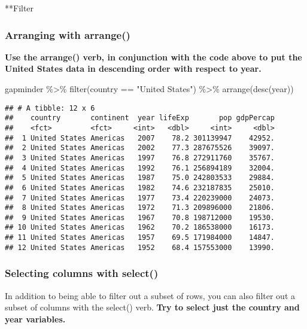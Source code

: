\documentclass[
]{article}
\newenvironment{Shaded}{\begin{snugshade}}{\end{snugshade}}
\newcommand{\FunctionTok}[1]{\textcolor[rgb]{0.00,0.00,0.00}{#1}}
\newcommand{\NormalTok}[1]{#1}
\newcommand{\SpecialCharTok}[1]{\textcolor[rgb]{0.00,0.00,0.00}{#1}}
\newcommand{\StringTok}[1]{\textcolor[rgb]{0.31,0.60,0.02}{#1}}
\begin{document}
**Filter

\hypertarget{arranging-with-arrange}{%
\subsubsection{Arranging with arrange()}\label{arranging-with-arrange}}

\textbf{Use the arrange() verb, in conjunction with the code above to
put the United States data in descending order with respect to year.}

\begin{Shaded}
\begin{Highlighting}[]
\NormalTok{gapminder }\SpecialCharTok{\%\textgreater{}\%} 
          \FunctionTok{filter}\NormalTok{(country }\SpecialCharTok{==} \StringTok{"United States"}\NormalTok{) }\SpecialCharTok{\%\textgreater{}\%} 
          \FunctionTok{arrange}\NormalTok{(}\FunctionTok{desc}\NormalTok{(year))}
\end{Highlighting}
\end{Shaded}

\begin{verbatim}
## # A tibble: 12 x 6
##    country       continent  year lifeExp       pop gdpPercap
##    <fct>         <fct>     <int>   <dbl>     <int>     <dbl>
##  1 United States Americas   2007    78.2 301139947    42952.
##  2 United States Americas   2002    77.3 287675526    39097.
##  3 United States Americas   1997    76.8 272911760    35767.
##  4 United States Americas   1992    76.1 256894189    32004.
##  5 United States Americas   1987    75.0 242803533    29884.
##  6 United States Americas   1982    74.6 232187835    25010.
##  7 United States Americas   1977    73.4 220239000    24073.
##  8 United States Americas   1972    71.3 209896000    21806.
##  9 United States Americas   1967    70.8 198712000    19530.
## 10 United States Americas   1962    70.2 186538000    16173.
## 11 United States Americas   1957    69.5 171984000    14847.
## 12 United States Americas   1952    68.4 157553000    13990.
\end{verbatim}

\hypertarget{selecting-columns-with-select}{%
\subsubsection{Selecting columns with
select()}\label{selecting-columns-with-select}}

In addition to being able to filter out a subset of rows, you can also
filter out a subset of columns with the select() verb. \textbf{Try to
select just the country and year variables.}
\end{document}
